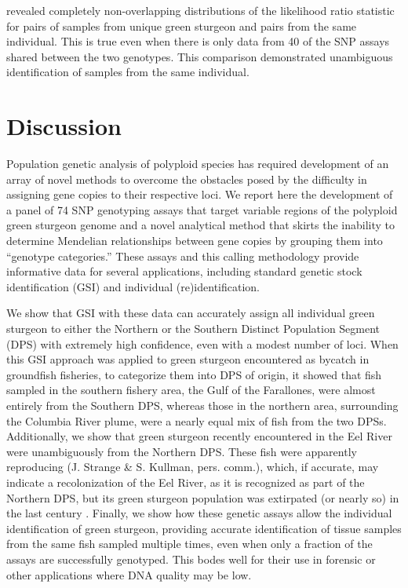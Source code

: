 revealed completely non-overlapping distributions of the likelihood ratio
statistic for pairs of samples from unique green sturgeon and pairs from the same
individual. This is true even when there is only data from 40 
of the SNP assays shared between the two genotypes.
This comparison
demonstrated unambiguous identification of samples from the same individual.




\section{Discussion}


Population genetic analysis of polyploid species has required development of an array of novel 
methods to overcome the obstacles posed by the difficulty in assigning gene copies to their 
respective loci. We report here the development of a panel of 74 SNP genotyping assays that 
target variable regions of the polyploid green sturgeon genome and a novel analytical method 
that skirts the inability to determine Mendelian relationships between gene copies by grouping 
them into ``genotype categories.'' These assays and this calling methodology provide informative 
data for several applications, including standard genetic stock identification (GSI) and 
individual (re)identification. 

We show that GSI with these data can accurately assign all 
individual green sturgeon to either the Northern or the Southern Distinct Population Segment (DPS) 
with extremely high confidence, even with a modest number of loci. When this GSI approach 
was applied to green sturgeon encountered as bycatch in groundfish fisheries, to categorize 
them into DPS of origin, it showed that fish sampled in the southern fishery area, the 
Gulf of the Farallones, were almost entirely from the Southern DPS, whereas those in the 
northern area, surrounding the Columbia River plume, were a nearly equal mix of fish from 
the two DPSs. Additionally, we show that green sturgeon recently encountered in the Eel River
were unambiguously 
from the Northern DPS. These fish were apparently reproducing (J. Strange \& S. Kullman, pers. comm.), 
which, if accurate, may indicate a recolonization of the Eel River, as it is recognized as
part of the Northern DPS, but its green sturgeon population was extirpated (or nearly so) in the last century \citep{adams2007population}. 
Finally, we show how these 
genetic assays allow the individual identification of green sturgeon, providing accurate 
identification of tissue samples from the same fish sampled multiple times, even when 
only a fraction of the assays are successfully genotyped. This bodes well for their 
use in forensic or other applications where DNA quality may be low. 



